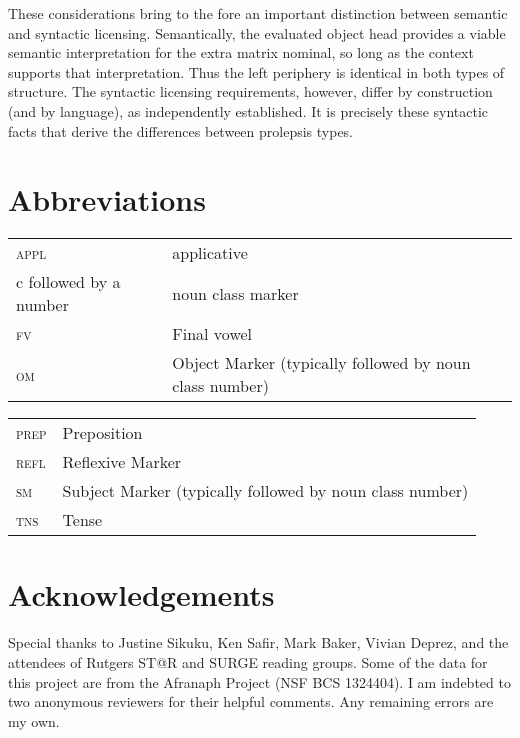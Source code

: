 \documentclass[output=paper,colorlinks,citecolor=brown]{langscibook}
\begin{document}
These considerations bring to the fore an important distinction between semantic and syntactic licensing. Semantically, the evaluated object head provides a viable semantic interpretation for the extra matrix nominal, so long as the context supports that interpretation. Thus the left periphery is identical in both types of structure. The syntactic licensing requirements, however, differ by construction (and by language), as independently established. It is precisely these syntactic facts that derive the differences between prolepsis types.

\section*{Abbreviations}
\begin{tabularx}{.5\textwidth}{@{}lQ}
{\textsc{appl}}  &  applicative\\
 {c} followed by a number  &  noun class marker\\
 {\textsc{fv}}  &  Final vowel\\
 {\textsc{om}}  &  Object Marker (typically followed by noun class number)\\
 \end{tabularx}\begin{tabularx}{.5\textwidth}{lQ@{}}
 {\textsc{prep}}  &  Preposition\\
 {\textsc{refl}}  &  Reflexive Marker\\
 {\textsc{sm}}  &  Subject Marker (typically followed by noun class number)\\
 {\textsc{tns}}  &  Tense
\end{tabularx}

\section*{Acknowledgements}
Special thanks to Justine Sikuku, Ken Safir, Mark Baker, Vivian Deprez, and the attendees of Rutgers ST@R and SURGE reading groups. Some of the data for this project are from the Afranaph Project (NSF BCS 1324404). I am indebted to two anonymous reviewers for their helpful comments. Any remaining errors are my own.%

{\sloppy\printbibliography[heading=subbibliography,notkeyword=this]}
\end{document}
